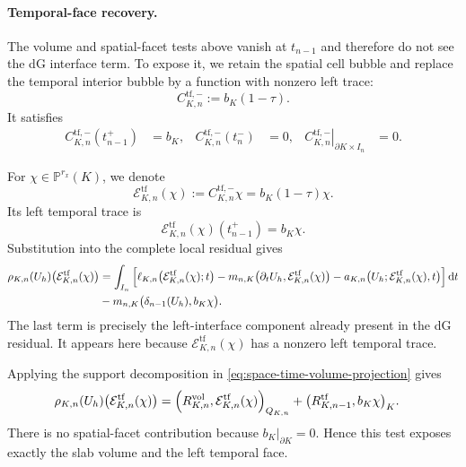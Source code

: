 \paragraph{Temporal-face recovery.}
The volume and spatial-facet tests above vanish at \(t_{n-1}\) and therefore do not see the dG interface term. To expose it, we retain the spatial cell bubble and replace the temporal interior bubble by a function with nonzero left trace:
\begin{equation}
  C_{K,n}^{\mathrm{tf},-}
  :=
  b_K(1-\tau).
  \label{eq:temporal-trace-cone}
\end{equation}
It satisfies
\begin{equation}
  \begin{aligned}
  C_{K,n}^{\mathrm{tf},-}(t_{n-1}^{+})&=b_K,
  &
  C_{K,n}^{\mathrm{tf},-}(t_n^{-})&=0,
  &
  \left.C_{K,n}^{\mathrm{tf},-}\right|_{\partial K\times I_n}&=0.
  \end{aligned}
  \label{eq:temporal-cone-traces}
\end{equation}

For \(\chi\in\mathbb P^{r_x}(K)\), we denote
\begin{equation}
  \mathcal{E}_{K,n}^{\mathrm{tf}}(\chi)
  :=
  C_{K,n}^{\mathrm{tf},-}\chi
  =
  b_K(1-\tau)\chi.
  \label{eq:temporal-recovery-test}
\end{equation}
Its left temporal trace is
\begin{equation}
  \mathcal{E}_{K,n}^{\mathrm{tf}}(\chi)(t_{n-1}^{+})
  =
  b_K\chi.
  \label{eq:temporal-recovery-test-trace}
\end{equation}
Substitution into the complete local residual gives
\begin{align}
  \rho_{K,n}(U_h)
  \bigl(\mathcal{E}_{K,n}^{\mathrm{tf}}(\chi)\bigr) &=
  \int_{I_n}
  \Big[
    \ell_{K,n}\bigl(\mathcal{E}_{K,n}^{\mathrm{tf}}(\chi);t\bigr)
    -
    m_{n,K}\bigl(
      \partial_tU_h,
      \mathcal{E}_{K,n}^{\mathrm{tf}}(\chi)
    \bigr)
    -
    a_{K,n}\bigl(
      U_h;
      \mathcal{E}_{K,n}^{\mathrm{tf}}(\chi),t
    \bigr)
  \Big]\,\mathrm dt
  \notag\\
  &-
  m_{n,K}\bigl(
    \delta_{n-1}(U_h),
    b_K\chi
  \bigr).
  \label{eq:temporal-cone-complete-residual}
\end{align}
The last term is precisely the left-interface component already present in the dG residual. It appears here because \(\mathcal{E}_{K,n}^{\mathrm{tf}}(\chi)\) has a nonzero left temporal trace.

Applying the support decomposition in \cref{eq:space-time-volume-projection} gives
\begin{equation}
  \begin{aligned}
  \rho_{K,n}(U_h)
  \bigl(\mathcal{E}_{K,n}^{\mathrm{tf}}(\chi)\bigr)
  ={}&
  \Bigl(
    R_{K,n}^{\mathrm{vol}},
    \mathcal{E}_{K,n}^{\mathrm{tf}}(\chi)
  \Bigr)_{Q_{K,n}} +
  \bigl(
    R_{K,n-1}^{\mathrm{tf}},
    b_K\chi
  \bigr)_K.
  \end{aligned}
  \label{eq:temporal-cone-support-splitting}
\end{equation}
There is no spatial-facet contribution because \(b_K|_{\partial K}=0\). Hence this test exposes exactly the slab volume and the left temporal face.

